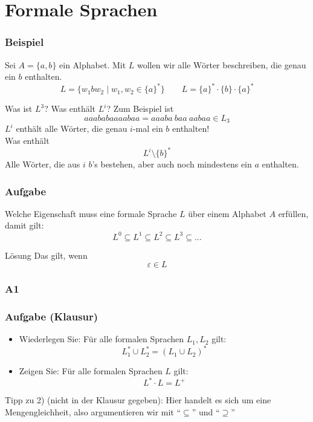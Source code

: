 \section{Formale Sprachen}

\begin{frame}
	\frametitle{Beispiel}
	Sei $A = \{a,b\}$ ein Alphabet. Mit $L$ wollen wir alle Wörter beschreiben, die genau ein $b$ enthalten. \\ \pause
	$$ L = \{w_1 b w_2 \mid w_1, w_2 \in \{a\}^\ast \}  \qquad  L = \{a\}^\ast \cdot \{b \} \cdot \{a\}^\ast$$
	
	Was ist $L^3$? Was enthält $L^i$? \pause
	Zum Beispiel ist $$aaababaaaabaa = aaaba \ baa \ aabaa \in L_3$$ \pause
	$L^i$ enthält alle Wörter, die genau $i$-mal ein $b$ enthalten! \\[1em]
	
	Was enthält $$L^i \setminus \{b\}^\ast$$ \pause
	Alle Wörter, die aus $i$ $b$'s bestehen, aber auch noch mindestens ein $a$ enthalten. \\
\end{frame}

\begin{frame}
	\frametitle{Aufgabe}
	Welche Eigenschaft muss eine formale Sprache $L$ über einem Alphabet
	$A$ erfüllen, damit gilt: $$ L^0 \subseteq L^1 \subseteq L^2 \subseteq L^3 \subseteq ... $$
	
	\pause
	\begin{block}{Lösung}
		Das gilt, wenn $$ \varepsilon \in L $$
	\end{block}
	
\end{frame}

\subsubsection{A1}
\begin{frame}
	\frametitle{Aufgabe (Klausur) }
		\begin{itemize}
			\item Wiederlegen Sie: Für alle formalen Sprachen $L_1 , L_2$ gilt: 
			$$L_1^\ast \cup L_2^\ast = (L_1 \cup L_2 )^\ast$$
			
			\item Zeigen Sie: Für alle formalen Sprachen $L$ gilt: 
				$$L^\ast \cdot L = L^+ $$ 
	\end{itemize}

	Tipp zu 2) (nicht in der Klausur gegeben): Hier handelt es sich um eine Mengengleichheit, also argumentieren wir mit \enquote{$\subseteq$} und \enquote{$\supseteq$}
\end{frame}

